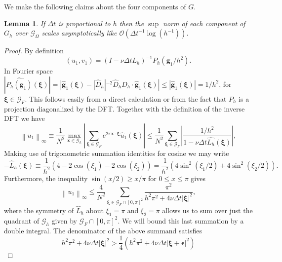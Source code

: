 \documentclass[preprint,12pt]{elsarticle}
\newcommand{\norm}[1]{\left\lVert#1\right\rVert}
\newtheorem{lemma}{Lemma}[section]
\begin{document}
We make the following claims about the four components of $G$.
\begin{lemma}
If $\Delta t$ is proportional to $h$ then the $\sup$ norm of each component of $G_h$ over $\mathcal{G}_\Omega$ scales asymptotically like $\mathcal{O}({\Delta t}^{-1}\log(h^{-1}))$.
\end{lemma}
\begin{proof}
By definition
\begin{equation}
(u_1,v_1) = (I -\nu\Delta t L_h)^{-1}  P_h (\mathbf{g}_1 / h^2).
\end{equation}
In Fourier space $|\widehat{P_h (\mathbf{g}_1)}(\mathbf{\xi})| = |\hat{\mathbf{g}}_1(\mathbf{\xi})-|\hat{D}_h|^{-2}\hat{D}_h\hat{D}_h\cdot\hat{\mathbf{g}}_1(\mathbf{\xi})| \leq |\hat{\mathbf{g}}_1(\mathbf{\xi})| = 1/h^2$, for $\mathbf{\xi} \in \mathcal{G}_F$. This follows easily from a direct calculation or from the fact that $P_h$ is a projection diagonalized by the DFT. 
Together with the definition of the inverse DFT we have
\begin{equation}
\norm{u_1}_\infty 
\equiv
\frac{1}{N^2}\max_{\mathbf{x}\in\mathcal{G}_h}
\left|\sum_{\mathbf{\xi}\in\mathcal{G}_F}
e^{2\pi\mathbf{x}\cdot\mathbf{\xi}}
\hat{u}_1(\mathbf{\xi})\right|
\leq
\frac{1}{N^2}\sum_{\mathbf{\xi}\in\mathcal{G}_F}
\left|\frac{1/h^2}
{1-\nu\Delta t \widehat{L_h}(\mathbf{\xi})}\right|,
\end{equation}
Making use of trigonometric summation identities for cosine we may write 
\begin{equation}
-\hat{L}_h(\mathbf{\xi}) 
\equiv
\frac{1}{h^2}\left(
4 - 2\cos(\xi_1) - 2\cos(\xi_2)
\right)
=
\frac{1}{h^2}\left(
4\sin^2(\xi_1/2) + 4\sin^2(\xi_2/2)
\right).
\end{equation}
Furthermore, the inequality $\sin (x/2) \geq x/\pi$ for $0 \leq x \leq \pi$ gives
\begin{equation}
\norm{u_1}_\infty \leq
\frac{4}{N^2}
\sum_{\mathbf{\xi} \in \mathcal{G}_F \cap [0,\pi]^2  }
\frac{\pi^2}{h^2\pi^2 + 4\nu\Delta t|\mathbf{\xi}|^2},
\end{equation}
where the symmetry of $\hat{L}_h$ about $\xi_1=\pi$ and $\xi_2=\pi$ allows us to sum over just the quadrant of $\mathcal{G}_h$ given by $\mathcal{G}_F \cap [0,\pi]^2$.
We will bound this last summation by a double integral.
The denominator of the above summand satisfies
\begin{equation}
h^2\pi^2 + 4\nu\Delta t|\mathbf{\xi}|^2 >
\frac{1}{4}\left(
h^2\pi^2 + 4\nu\Delta t|\mathbf{\xi}+\mathbf{\epsilon}|^2
\right)
\end{equation}

\end{proof}
\end{document}
